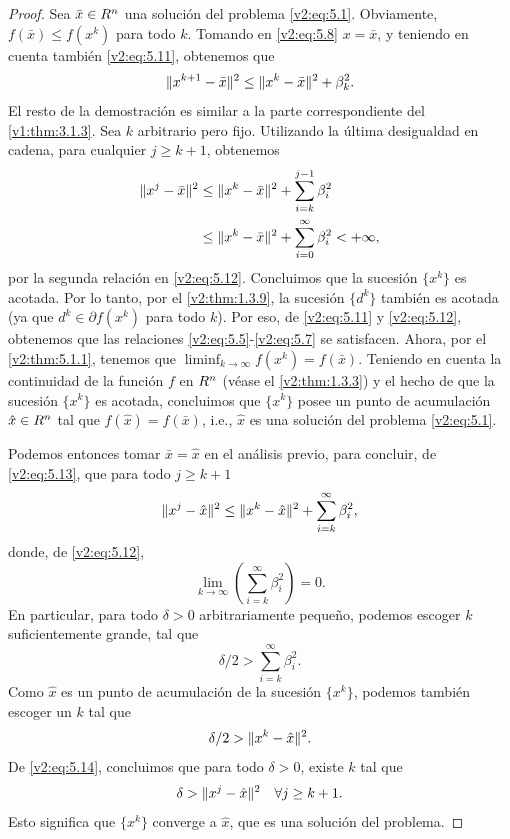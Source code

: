 \begin{proof}
    Sea $\bar{x} \in R^n$ una solución del problema \eqref{v2:eq:5.1}. Obviamente, $f(\bar{x}) \le f(x^k)$ para todo $k$. Tomando en \eqref{v2:eq:5.8} $x = \bar{x}$, y teniendo en cuenta también \eqref{v2:eq:5.11}, obtenemos que
    \[
        \lVert x^{k+1} - \bar{x}\rVert^2 \le \lVert x^k - \bar{x}\rVert^2 + \beta_k^2.
    \]
    El resto de la demostración es similar a la parte correspondiente del \cref{v1:thm:3.1.3}.
    Sea $k$ arbitrario pero fijo. Utilizando la última desigualdad en cadena, para cualquier $j \ge k+1$, obtenemos
    \begin{align}
        \lVert x^j - \bar{x}\rVert^2 &\le \lVert x^k - \bar{x}\rVert^2 + \sum_{i=k}^{j-1} \beta_i^2 \label{v2:eq:5.13} \\
        &\le \lVert x^k - \bar{x}\rVert^2 + \sum_{i=0}^\infty \beta_i^2 < +\infty, \nonumber
    \end{align}
    por la segunda relación en \eqref{v2:eq:5.12}. Concluimos que la sucesión $\{x^k\}$ es acotada. Por lo tanto, por el \cref{v2:thm:1.3.9}, la sucesión $\{d^k\}$ también es acotada (ya que $d^k \in \partial f(x^k)$ para todo $k$). Por eso, de \eqref{v2:eq:5.11} y \eqref{v2:eq:5.12}, obtenemos que las relaciones \eqref{v2:eq:5.5}-\eqref{v2:eq:5.7} se satisfacen. Ahora, por el \cref{v2:thm:5.1.1}, tenemos que $\liminf_{k \to \infty} f(x^k) = f(\bar{x})$. Teniendo en cuenta la continuidad de la función $f$ en $R^n$ (véase el \cref{v2:thm:1.3.3}) y el hecho de que la sucesión $\{x^k\}$ es acotada, concluimos que $\{x^k\}$ posee un punto de acumulación $\hat{x} \in R^n$ tal que $f(\hat{x}) = f(\bar{x})$, i.e., $\hat{x}$ es una solución del problema \eqref{v2:eq:5.1}.
    
    Podemos entonces tomar $\bar{x} = \hat{x}$ en el análisis previo, para concluir, de \eqref{v2:eq:5.13}, que para todo $j \ge k+1$
    \begin{equation}
        \lVert x^j - \hat{x}\rVert^2 \le \lVert x^k - \hat{x}\rVert^2 + \sum_{i=k}^\infty \beta_i^2,
        \label{v2:eq:5.14}
    \end{equation}
    donde, de \eqref{v2:eq:5.12},
    \[
        \lim_{k \to \infty} \left( \sum_{i=k}^\infty \beta_i^2 \right) = 0.
    \]
    En particular, para todo $\delta > 0$ arbitrariamente pequeño, podemos escoger $k$ suficientemente grande, tal que
    \[
        \delta/2 > \sum_{i=k}^\infty \beta_i^2.
    \]
    Como $\hat{x}$ es un punto de acumulación de la sucesión $\{x^k\}$, podemos también escoger un $k$ tal que
    \[
        \delta/2 > \lVert x^k - \hat{x}\rVert^2.
    \]
    De \eqref{v2:eq:5.14}, concluimos que para todo $\delta > 0$, existe $k$ tal que
    \[
        \delta > \lVert x^j - \hat{x}\rVert^2 \quad \forall j \ge k+1.
    \]
    Esto significa que $\{x^k\}$ converge a $\hat{x}$, que es una solución del problema.
\end{proof}

